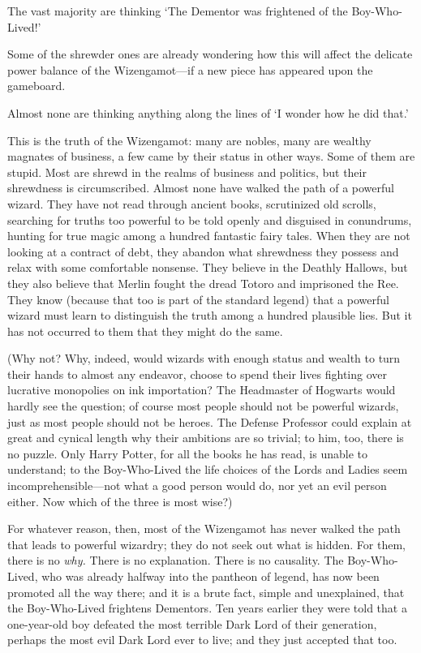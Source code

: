 The vast majority are thinking `The Dementor was frightened of the
Boy-Who-Lived!'

Some of the shrewder ones are already wondering how this will affect the
delicate power balance of the Wizengamot---if a new piece has appeared upon the
gameboard.

Almost none are thinking anything along the lines of `I wonder how he did that.'

This is the truth of the Wizengamot: many are nobles, many are wealthy magnates
of business, a few came by their status in other ways. Some of them are stupid.
Most are shrewd in the realms of business and politics, but their shrewdness is
circumscribed. Almost none have walked the path of a powerful wizard. They have
not read through ancient books, scrutinized old scrolls, searching for truths
too powerful to be told openly and disguised in conundrums, hunting for true magic
among a hundred fantastic fairy tales. When they are not looking at a contract
of debt, they abandon what shrewdness they possess and relax with some
comfortable nonsense. They believe in the Deathly Hallows, but they also
believe that Merlin fought the dread Totoro and imprisoned the Ree. They know
(because that too is part of the standard legend) that a powerful wizard must
learn to distinguish the truth among a hundred plausible lies. But it has not
occurred to them that they might do the same.

(Why not? Why, indeed, would wizards with enough status and wealth to turn
their hands to almost any endeavor, choose to spend their lives fighting over
lucrative monopolies on ink importation? The Headmaster of Hogwarts would
hardly see the question; of course most people should not be powerful wizards,
just as most people should not be heroes. The Defense Professor could explain
at great and cynical length why their ambitions are so trivial; to him, too,
there is no puzzle. Only Harry Potter, for all the books he has read, is unable
to understand; to the Boy-Who-Lived the life choices of the Lords and Ladies
seem incomprehensible---not what a good person would do, nor yet an evil person
either. Now which of the three is most wise?)

For whatever reason, then, most of the Wizengamot has never walked the path
that leads to powerful wizardry; they do not seek out what is hidden. For them,
there is no \emph{why.} There is no explanation. There is no causality. The
Boy-Who-Lived, who was already halfway into the pantheon of legend, has now
been promoted all the way there; and it is a brute fact, simple and
unexplained, that the Boy-Who-Lived frightens Dementors. Ten years earlier they
were told that a one-year-old boy defeated the most terrible Dark Lord of their
generation, perhaps the most evil Dark Lord ever to live; and they just
accepted that too.

